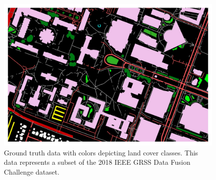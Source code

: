 \documentclass[
twocolumn,
]{ceurart}
\begin{document}

\begin{figure}[!t]
\centering
\includegraphics[width=.7\columnwidth]{figures/gt.jpg}
\caption{Ground truth data with colors depicting land cover classes. This data represents a subset of the 2018 IEEE GRSS Data Fusion Challenge dataset.}
\label{fig::gt}
\end{figure}

% 
\end{document}
